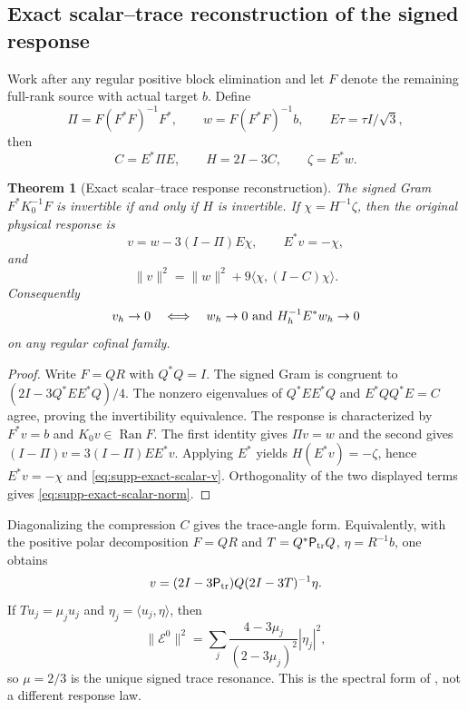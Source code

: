 \documentclass[11pt]{article}
\newtheorem{theorem}{Theorem}[section]
\theoremstyle{definition}
\theoremstyle{remark}
\newcommand{\Ran}{\operatorname{Ran}}
\begin{document}
\subsection{Exact scalar--trace reconstruction of the signed response}

Work after any regular positive block elimination and let $F$ denote the
remaining full-rank source with actual target $b$.  Define
\begin{equation}
 \Pi=F(F^*F)^{-1}F^*,\qquad
 w=F(F^*F)^{-1}b,
 \qquad E\tau=\tau I/\sqrt3,
 \label{eq:supp-exact-Pi-w}
\end{equation}
then
\begin{equation}
 C=E^*\Pi E,\qquad H=2I-3C,\qquad \zeta=E^*w.
 \label{eq:supp-exact-trace-data}
\end{equation}

\begin{theorem}[Exact scalar--trace response reconstruction]
\label{thm:supp-exact-scalar-reconstruction}
The signed Gram $F^*K_0^{-1}F$ is invertible if and only if $H$ is
invertible.  If $\chi=H^{-1}\zeta$, then the original physical response is
\begin{equation}
 \boxed{v=w-3(I-\Pi)E\chi,\qquad E^*v=-\chi,}
 \label{eq:supp-exact-scalar-v}
\end{equation}
and
\begin{equation}
 \boxed{\|v\|^2=\|w\|^2+9\langle\chi,(I-C)\chi\rangle.}
 \label{eq:supp-exact-scalar-norm}
\end{equation}
Consequently
\begin{equation}
 v_h\to0\quad\Longleftrightarrow\quad
 w_h\to0\ \hbox{and}\ H_h^{-1}E^*w_h\to0
 \label{eq:supp-exact-response-equivalence}
\end{equation}
on any regular cofinal family.
\end{theorem}
\begin{proof}
Write $F=QR$ with $Q^*Q=I$.  The signed Gram is congruent to
$(2I-3Q^*EE^*Q)/4$.  The nonzero eigenvalues of
$Q^*EE^*Q$ and $E^*QQ^*E=C$ agree, proving the invertibility equivalence.
The response is characterized by $F^*v=b$ and $K_0v\in\Ran F$.  The first
identity gives $\Pi v=w$ and the second gives
$(I-\Pi)v=3(I-\Pi)EE^*v$.  Applying $E^*$ yields
$H(E^*v)=-\zeta$, hence $E^*v=-\chi$ and
\eqref{eq:supp-exact-scalar-v}.  Orthogonality of the two displayed terms
gives \eqref{eq:supp-exact-scalar-norm}.
\end{proof}

Diagonalizing the compression $C$ gives the trace-angle form.  Equivalently,
with the positive polar decomposition $F=QR$ and
$T=Q^*\mathsf P_{\rm tr}Q$, $\eta=R^{-1}b$, one obtains
\begin{equation}
 v=(2I-3\mathsf P_{\rm tr})Q(2I-3T)^{-1}\eta.
 \label{eq:supp-exact-response-polar}
\end{equation}
If $Tu_j=\mu_ju_j$ and $\eta_j=\langle u_j,\eta\rangle$, then
\begin{equation}
 \boxed{\|\mathcal E^0\|^2
 =\sum_j\frac{4-3\mu_j}{(2-3\mu_j)^2}|\eta_j|^2,}
 \label{eq:supp-exact-physical-norm}
\end{equation}
so $\mu=2/3$ is the unique signed trace resonance.  This is the spectral
form of , not a different response
law.
\end{document}
